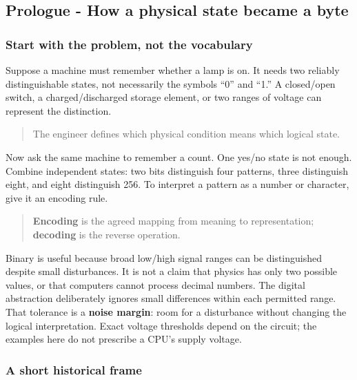\subsection{Prologue - How a physical state became a byte}\label{05-engine-i-ch001-prologue---how-a-physical-state-became-a-byte}

\subsubsection{Start with the problem, not the vocabulary}\label{05-engine-i-ch001-start-with-the-problem-not-the-vocabulary}

Suppose a machine must remember whether a lamp is on. It needs two reliably distinguishable states, not necessarily the symbols ``0'' and ``1.'' A closed/open switch, a charged/discharged storage element, or two ranges of voltage can represent the distinction.

\begin{quote}
The engineer defines which physical condition means which logical state.
\end{quote}

Now ask the same machine to remember a count. One yes/no state is not enough. Combine independent states: two bits distinguish four patterns, three distinguish eight, and eight distinguish 256. To interpret a pattern as a number or character, give it an encoding rule.

\begin{quote}
\textbf{Encoding} is the agreed mapping from meaning to representation; \textbf{decoding} is the reverse operation.
\end{quote}

Binary is useful because broad low/high signal ranges can be distinguished despite small disturbances. It is not a claim that physics has only two possible values, or that computers cannot process decimal numbers. The digital abstraction deliberately ignores small differences within each permitted range. That tolerance is a \textbf{noise margin}: room for a disturbance without changing the logical interpretation. Exact voltage thresholds depend on the circuit; the examples here do not prescribe a CPU's supply voltage.

\subsubsection{A short historical frame}\label{05-engine-i-ch001-a-short-historical-frame}

